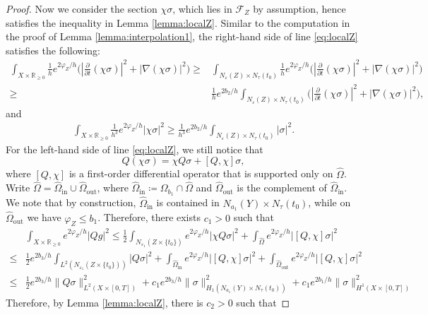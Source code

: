 \documentclass[10pt,a4paper]{amsart}
\newcommand{\R}{\mathbb{R}}
\begin{document}
\begin{proof}
	Now we consider the section $\chi\sigma$, which lies in $\mathcal F_Z$ by assumption, hence satisfies the inequality in Lemma \ref{lemma:localZ}. Similar to the computation in the proof of Lemma \ref{lemma:interpolation1}, the right-hand side of line \eqref{eq:localZ} satisfies the following:
	\begin{align*}
	\int_{X\times\R_{\geq 0}}\frac 1 he^{2\varphi_Z/h}\Big(|\frac{\partial}{\partial t} (\chi\sigma)|^2+|\nabla (\chi\sigma)|^2\Big)\geq&\int_{N_\varepsilon(Z)\times N_\tau(t_0)}\frac 1 he^{2\varphi_Z/h}\Big(|\frac{\partial}{\partial t} (\chi\sigma)|^2+|\nabla (\chi\sigma)|^2\Big)\\
	\geq &\frac 1 he^{2b_2/h}\int_{N_\varepsilon(Z)\times N_\tau(t_0)}\Big(|\frac{\partial}{\partial t} (\chi\sigma)|^2+|\nabla (\chi\sigma)|^2\Big),
	\end{align*}
	and
	\begin{align*}
		\int_{X\times\R_{\geq 0}}\frac{1}{h^3}e^{2\varphi_Z/h}|\chi\sigma|^2\geq \frac{1}{h^3}e^{2b_2/h}\int_{N_\varepsilon(Z)\times N_\tau(t_0)}|\sigma|^2.
	\end{align*}	
	For the left-hand side of line \eqref{eq:localZ}, we still notice that 
	$$Q(\chi\sigma)=\chi Q\sigma+[Q,\chi]\sigma,$$
	where $[Q,\chi]$ is a first-order differential operator that is supported only on $\widehat\Omega$. Write $\widehat\Omega=\widehat\Omega_{\text{in}}\cup \widehat\Omega_{\text{out}}$, where $\widehat\Omega_{\text{in}}\coloneqq \Omega_{b_1}\cap\widehat\Omega$ and $\widehat\Omega_{\text{out}}$ is the complement of $\widehat\Omega_{\text{in}}$. We note that by construction, $\widehat\Omega_{\text{in}}$ is contained in $N_{a_1}(Y)\times N_\tau(t_0)$, while on  $\widehat\Omega_{\text{out}}$ we have $\varphi_Z\leq b_1$. Therefore, there exists $c_1>0$ such that
	\begin{align*}
		&\int_{X\times\R_{\geq 0}}e^{2\varphi_Z/h}|Qg|^2\leq \frac 1 2\int_{N_{\varepsilon_1}(Z\times\{t_0\})}e^{2\varphi_Z/h}|\chi Q\sigma|^2+\int_{\widehat\Omega}e^{2\varphi_Z/h}|[Q,\chi]\sigma|^2\\
	\leq &\frac1 2e^{2b_3/h}\int_{L^2(N_{\varepsilon_1}(Z\times\{t_0\}))}|Q\sigma|^2+\int_{\widehat\Omega_{\text{in}}}e^{2\varphi_Z/h}|[Q,\chi]\sigma|^2+\int_{\widehat\Omega_{\text{out}}}e^{2\varphi_Z/h}|[Q,\chi]\sigma|^2\\
	\leq &\frac1 2e^{2b_3/h}\|Q\sigma\|^2_{L^2(X\times[0,T])}+c_1e^{2b_3/h}\|\sigma\|^2_{H_1(N_{a_1}(Y)\times N_\tau(t_0))}+c_1e^{2b_1/h}\|\sigma\|^2_{H^1(X\times[0,T])}
	\end{align*}
	Therefore, by Lemma \ref{lemma:localZ}, there is $c_2>0$ such that

\end{proof}
\end{document}
